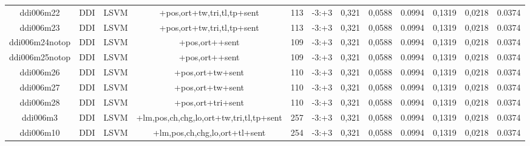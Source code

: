 \documentclass[a4paper]{article}
\begin{document}
\begin{landscape}
\begin{center}
\begin{tabular}{ |c|c|c|c|c|c|c|c|c|c|c|c|}
 
 	
 	\small{ ddi006m22 } & \small{ DDI} & \small{  LSVM }  & +pos,ort+tw,tri,tl,tp+sent  &  113 &  \small{  -3:+3 }  &  0,321 & 0,0588 & 0.0994  &  0,1319 & 0,0218 & 0.0374 \\
 	

 
 	
 	\small{ ddi006m23 } & \small{ DDI} & \small{  LSVM }  & +pos,ort+tw,tri,tl,tp+sent  &  113 &  \small{  -3:+3 }  &  0,321 & 0,0588 & 0.0994  &  0,1319 & 0,0218 & 0.0374 \\
 	

 
 	
 	\small{ ddi006m24notop } & \small{ DDI} & \small{  LSVM }  & +pos,ort++sent  &  109 &  \small{  -3:+3 }  &  0,321 & 0,0588 & 0.0994  &  0,1319 & 0,0218 & 0.0374 \\
 	

 
 	
 	\small{ ddi006m25notop } & \small{ DDI} & \small{  LSVM }  & +pos,ort++sent  &  109 &  \small{  -3:+3 }  &  0,321 & 0,0588 & 0.0994  &  0,1319 & 0,0218 & 0.0374 \\
 	

 
 	
 	\small{ ddi006m26 } & \small{ DDI} & \small{  LSVM }  & +pos,ort+tw+sent  &  110 &  \small{  -3:+3 }  &  0,321 & 0,0588 & 0.0994  &  0,1319 & 0,0218 & 0.0374 \\
 	

 
 	
 	\small{ ddi006m27 } & \small{ DDI} & \small{  LSVM }  & +pos,ort+tw+sent  &  110 &  \small{  -3:+3 }  &  0,321 & 0,0588 & 0.0994  &  0,1319 & 0,0218 & 0.0374 \\
 	

 
 	
 	\small{ ddi006m28 } & \small{ DDI} & \small{  LSVM }  & +pos,ort+tri+sent  &  110 &  \small{  -3:+3 }  &  0,321 & 0,0588 & 0.0994  &  0,1319 & 0,0218 & 0.0374 \\
 	

 
 	
 	\small{ ddi006m3 } & \small{ DDI} & \small{  LSVM }  & +lm,pos,ch,chg,lo,ort+tw,tri,tl,tp+sent  &  257 &  \small{  -3:+3 }  &  0,321 & 0,0588 & 0.0994  &  0,1319 & 0,0218 & 0.0374 \\
 	

 
 	
 	\small{ ddi006m10 } & \small{ DDI} & \small{  LSVM }  & +lm,pos,ch,chg,lo,ort+tl+sent  &  254 &  \small{  -3:+3 }  &  0,321 & 0,0588 & 0.0994  &  0,1319 & 0,0218 & 0.0374 \\
 	


\end{tabular}
\end{center}
\end{landscape}
\end{document}
